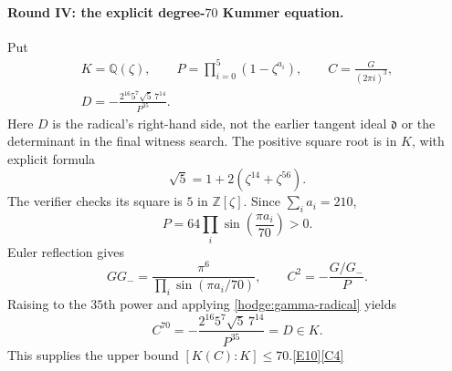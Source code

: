 \documentclass[11pt]{article}
\newcommand{\Q}{\mathbb Q}
\newcommand{\Z}{\mathbb Z}
\newcommand{\src}[1]{\hyperlink{src:#1}{[#1]}}
\begin{document}
\paragraph{Round IV: the explicit degree-$70$ Kummer equation.}
Put
\begin{equation}\label{hodge:kummer-definitions}
 \begin{gathered}
 K=\Q(\zeta),\qquad
 P=\prod_{i=0}^{5}(1-\zeta^{a_i}),\qquad C=\frac{G}{(2\pi i)^3},\\
 D=-\frac{2^{16}5^7\sqrt5\,7^{14}}{P^{35}}.
 \end{gathered}
\end{equation}
Here $D$ is the radical's right-hand side, not the earlier tangent ideal
$\mathfrak d$ or the determinant in the final witness search. The positive
square root is in $K$, with explicit formula
\[
 \sqrt5=1+2(\zeta^{14}+\zeta^{56}).
\]
The verifier checks its square is $5$ in $\Z[\zeta]$.
Since $\sum_i a_i=210$,
\[
 P=64\prod_i\sin\left(\frac{\pi a_i}{70}\right)>0.
\]
Euler reflection gives
\[
 GG_-=\frac{\pi^6}{\prod_i\sin(\pi a_i/70)},\qquad
 C^2=-\frac{G/G_-}{P}.
\]
Raising to the $35$th power and applying \eqref{hodge:gamma-radical} yields
\begin{equation}\label{hodge:kummer}
 \boxed{\quad C^{70}
 =-\frac{2^{16}5^7\sqrt5\,7^{14}}{P^{35}}
 =D\in K.\quad}
\end{equation}
This supplies the upper bound $[K(C):K]\le70$.\src{E10}\src{C4}
\end{document}
